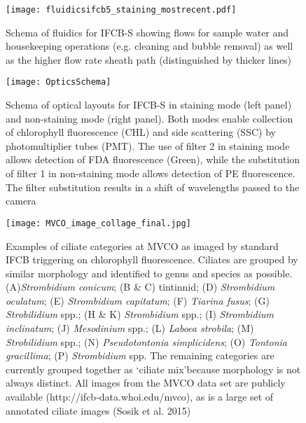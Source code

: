 \clearpage
\vspace*{-3in}

\begin{figure}

\graphicspath{ {Chapter2_Figures/} }
\texttt{[image: fluidicsifcb5\_staining\_mostrecent.pdf]}
\caption[Schema of fluidics for IFCB-S] {Schema of fluidics for IFCB-S showing flows for sample water
and housekeeping operations (e.g. cleaning and bubble removal) as well as the higher flow rate sheath path (distinguished by thicker lines)}
\label{arm:fig2}
\end{figure}


\vspace*{-3in}

\begin{figure}

\graphicspath{ {Chapter2_Figures/} }
\texttt{[image: OpticsSchema]}
\caption[Schema of optical layouts for IFCB-S in non-staining mode] {Schema of optical layouts for IFCB-S in staining mode (left panel) and non-staining mode (right panel). Both modes enable collection of chlorophyll fluorescence (CHL) and side scattering (SSC) by photomultiplier tubes (PMT). The use of filter 2 in staining mode allows detection of FDA fluorescence (Green), while the substitution of filter 1 in non-staining mode allows detection of PE fluorescence. The filter substitution results in a shift of wavelengths passed to the camera}
\label{arm:fig2}
\end{figure}

\newpage
\begin{figure}

\graphicspath{ {Chapter2_Figures/} }
\texttt{[image: MVCO\_image\_collage\_final.jpg]}
\caption [Images of ciliates at MVCO]  {Examples of ciliate categories at MVCO as imaged by standard IFCB triggering on chlorophyll fluorescence. Ciliates are grouped by similar morphology and identified to genus and species as possible. (A)\textit{Strombidium conicum}; (B \& C) tintinnid; (D) \textit{Strombidium oculatum}; (E) \textit{Strombidium capitatum}; (F) \textit{Tiarina fusus}; (G) \textit{Strobilidium} spp.; (H \& K) \textit{Strombidium} spp.; (I) \textit{Strombidium inclinatum}; (J) \textit{Mesodinium} spp.; (L) \textit{Laboea strobila}; (M) \textit{Strobilidium} spp.; (N) \textit{Pseudotontonia simplicidens}; (O) \textit{Tontonia gracillima}; (P) \textit{Strombidium} spp. The remaining categories are currently grouped together as \lq{ciliate mix}\rq because morphology is not always distinct. All images from the MVCO data set are publicly available (http://ifcb-data.whoi.edu/mvco), as is a large set of annotated ciliate images (Sosik et al. 2015)}
\label{arm:fig2}
\end{figure}

